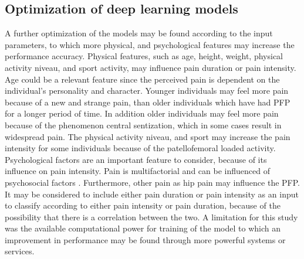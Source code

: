 \subsection*{Optimization of deep learning models}
A further optimization of the models may be found according to the input parameters, to which more physical, and psychological features may increase the performance accuracy. Physical features, such as age, height, weight, physical activity niveau, and sport activity, may influence pain duration or pain intensity. Age could be a relevant feature since the perceived pain is dependent on the individual’s personality and character. Younger individuals may feel more pain because of a new and strange pain, than older individuals which have had PFP for a longer period of time. In addition older individuals may feel more pain because of the phenomenon central sentization, which in some cases result in widespread pain. The physical activity niveau, and sport may increase the pain intensity for some individuals because of the patellofemoral loaded activity. Psychological factors are an important feature to consider, because of its influence on pain intensity. Pain is multifactorial and can be influenced of psychosocial factors \citep{Roos2003}. Furthermore, other pain as hip pain may influence the PFP. 
It may be considered to include either pain duration or pain intensity as an input to classify according to either pain intensity or pain duration, because of the possibility that there is a correlation between the two.
A limitation for this study was the available computational power for training of the model to which an improvement in performance may be found through more powerful systems or services. 
